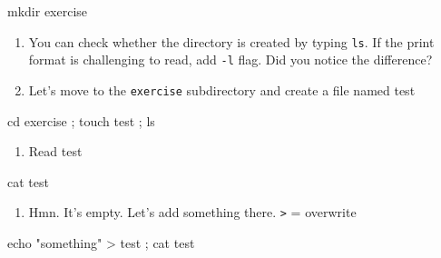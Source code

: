 \documentclass[
  letterpaper,
  DIV=11,
  numbers=noendperiod]{scrreprt}
\newenvironment{Shaded}{\begin{snugshade}}{\end{snugshade}}
\newcommand{\BuiltInTok}[1]{\textcolor[rgb]{0.00,0.23,0.31}{#1}}
\newcommand{\FunctionTok}[1]{\textcolor[rgb]{0.28,0.35,0.67}{#1}}
\newcommand{\KeywordTok}[1]{\textcolor[rgb]{0.00,0.23,0.31}{#1}}
\newcommand{\NormalTok}[1]{\textcolor[rgb]{0.00,0.23,0.31}{#1}}
\newcommand{\OperatorTok}[1]{\textcolor[rgb]{0.37,0.37,0.37}{#1}}
\newcommand{\StringTok}[1]{\textcolor[rgb]{0.13,0.47,0.30}{#1}}
\providecommand{\tightlist}{%
  \setlength{\itemsep}{0pt}\setlength{\parskip}{0pt}}\usepackage{longtable,booktabs,array}
\begin{document}
\begin{Shaded}
\begin{Highlighting}[]

\FunctionTok{mkdir}\NormalTok{ exercise }
\end{Highlighting}
\end{Shaded}

\begin{enumerate}
\def\labelenumi{\arabic{enumi}.}
\setcounter{enumi}{1}
\item
  You can check whether the directory is created by typing \texttt{ls}.
  If the print format is challenging to read, add \texttt{-l} flag. Did
  you notice the difference?
\item
  Let's move to the \texttt{exercise} subdirectory and create a file
  named test
\end{enumerate}

\begin{Shaded}
\begin{Highlighting}[]

\BuiltInTok{cd}\NormalTok{ exercise }\KeywordTok{;} \FunctionTok{touch}\NormalTok{ test }\KeywordTok{;} \FunctionTok{ls} 
\end{Highlighting}
\end{Shaded}

\begin{enumerate}
\def\labelenumi{\arabic{enumi}.}
\setcounter{enumi}{3}
\tightlist
\item
  Read test
\end{enumerate}

\begin{Shaded}
\begin{Highlighting}[]

\FunctionTok{cat}\NormalTok{ test }
\end{Highlighting}
\end{Shaded}

\begin{enumerate}
\def\labelenumi{\arabic{enumi}.}
\setcounter{enumi}{4}
\tightlist
\item
  Hmn. It's empty. Let's add something there. \texttt{\textgreater{}} =
  overwrite
\end{enumerate}

\begin{Shaded}
\begin{Highlighting}[]

\BuiltInTok{echo} \StringTok{"something"} \OperatorTok{\textgreater{}}\NormalTok{ test }\KeywordTok{;} \FunctionTok{cat}\NormalTok{ test }
\end{Highlighting}
\end{Shaded}
\end{document}
